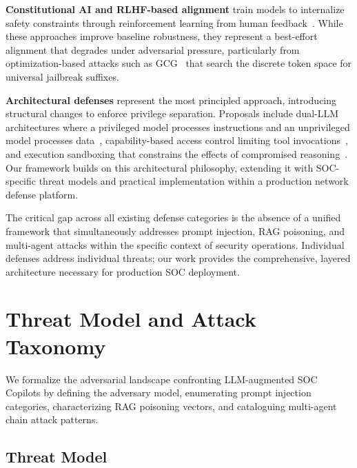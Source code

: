 \documentclass[journal,twoside]{IEEEtran}
\begin{document}
\textbf{Constitutional AI and RLHF-based alignment} train models to internalize safety constraints through reinforcement learning from human feedback~\cite{bai2022constitutional}. While these approaches improve baseline robustness, they represent a best-effort alignment that degrades under adversarial pressure, particularly from optimization-based attacks such as GCG~\cite{zou2023universal} that search the discrete token space for universal jailbreak suffixes.

\textbf{Architectural defenses} represent the most principled approach, introducing structural changes to enforce privilege separation. Proposals include dual-LLM architectures where a privileged model processes instructions and an unprivileged model processes data~\cite{chen2024struq}, capability-based access control limiting tool invocations~\cite{wu2024autogen}, and execution sandboxing that constrains the effects of compromised reasoning~\cite{cohen2024multiagent}. Our framework builds on this architectural philosophy, extending it with SOC-specific threat models and practical implementation within a production network defense platform.

The critical gap across all existing defense categories is the absence of a unified framework that simultaneously addresses prompt injection, RAG poisoning, and multi-agent attacks within the specific context of security operations. Individual defenses address individual threats; our work provides the comprehensive, layered architecture necessary for production SOC deployment.


\section{Threat Model and Attack Taxonomy}
\label{sec:threat}

We formalize the adversarial landscape confronting LLM-augmented SOC
Copilots by defining the adversary model, enumerating prompt injection
categories, characterizing RAG poisoning vectors, and cataloguing
multi-agent chain attack patterns.

\subsection{Threat Model}
\label{sec:threat:model}
\end{document}
